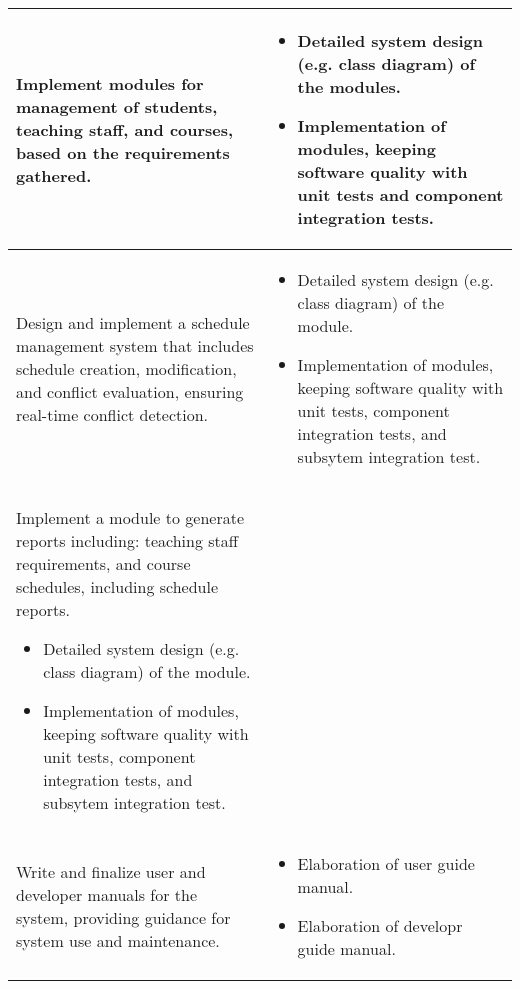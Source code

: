 \begin{longtable}{|p{3in}|p{3in}|}
Implement modules for management of students, teaching staff, and courses, based on the requirements gathered. &
\begin{itemize}
    \item Detailed system design (e.g. class diagram) of the modules.
    \item Implementation of modules, keeping software quality with unit tests and component integration tests.
\end{itemize}
\\\hline

Design and implement a schedule management system that includes schedule creation, modification, and conflict evaluation, ensuring real-time conflict detection. &
\begin{itemize}
    \item Detailed system design (e.g. class diagram) of the module.
    \item Implementation of modules, keeping software quality with unit tests, component integration tests, and subsytem integration test.
\end{itemize}
\\\hline

Implement a module to generate reports including: teaching staff requirements, and course schedules, including schedule reports.
\begin{itemize}
    \item Detailed system design (e.g. class diagram) of the module.
    \item Implementation of modules, keeping software quality with unit tests, component integration tests, and subsytem integration test.
\end{itemize}
\\\hline

Write and finalize user and developer manuals for the system, providing guidance for system use and maintenance.&
\begin{itemize}
    \item Elaboration of user guide manual.
    \item Elaboration of developr guide manual.
\end{itemize}
\\\hline
\end{longtable}
